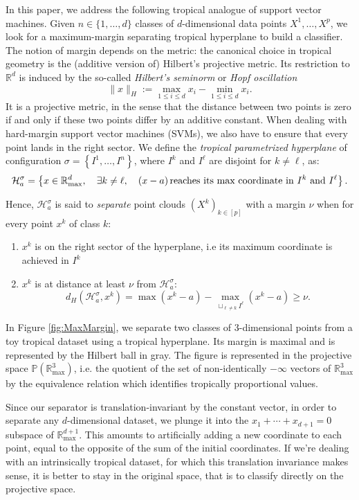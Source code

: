 \documentclass[oneside,english,a4paper]{amsart}
\numberwithin{equation}{section}
\numberwithin{figure}{section}
\theoremstyle{plain}
\theoremstyle{definition}
\theoremstyle{plain}
\theoremstyle{remark}
\theoremstyle{plain}
\theoremstyle{definition}
\theoremstyle{definition}
\begin{document}
In this paper, we address the following tropical analogue of support
vector machines. Given $n\in\{1,\ldots, d\}$ classes of $d$-dimensional data
points $X^{1},\ldots,X^{p}$, we look for a maximum-margin separating
tropical hyperplane to build a classifier. The notion of margin depends
on the metric: the canonical choice in tropical geometry is the (additive
version of) Hilbert's projective metric. Its restriction to $\mathbb{R}^{d}$
is induced by the so-called \emph{Hilbert's seminorm} or \emph{Hopf
oscillation}
\[
\lVert x\rVert_{H}:=\max_{1\le i\le d}x_{i}-\min_{1\le i\le d}x_{i}.
\]
It is a projective metric, in the sense that the distance between
two points is zero if and only if these two points differ by an additive
constant. When dealing with hard-margin support vector machines (SVMs),
we also have to ensure that every point lands in the right sector.
We define the \emph{tropical parametrized hyperplane} of configuration
$\sigma=\left\{I^{1},\ldots,I^{n}\right\}$, where $I^{k}$ and $I^{\ell}$
are disjoint for $k\ne\ell$, as:
\[
\mathcal{H}_{a}^{\sigma}=\left\{x\in\mathbb{R}_{\max}^{d},\quad\exists k\ne\ell,\quad (x-a)\,\text{reaches its max coordinate in \ensuremath{I^{k}} and \ensuremath{I^{\ell}}}\right\}.
\]

Hence, $\mathcal{H}_{a}^{\sigma}$ is said to \emph{separate} point
clouds $(X^{k})_{k\in[p]}$ with a margin $\nu$ when for every point
$x^{k}$ of class $k$:
\begin{enumerate}
\item $x^{k}$ is on the right sector of the hyperplane, i.e its maximum
coordinate is achieved in $I^{k}$
\item $x^{k}$ is at distance at least $\nu$ from $\mathcal{H}_{a}^{\sigma}$:
\begin{equation*}
d_H(\mathcal{H}_{a}^{\sigma},x^{k})=\max(x^{k}-a)-\max_{\sqcup_{\ell\ne k}I^{\ell}}(x^{k}-a)\ge\nu.
\end{equation*}
\end{enumerate}
In Figure \ref{fig:MaxMargin}, we separate two classes
of $3$-dimensional points from a toy tropical dataset using a tropical
hyperplane. Its margin is maximal and is represented by the Hilbert
ball in gray. The figure is represented in the projective space $\mathbb{P}\left(\mathbb{R}_{\text{max}}^{3}\right)$,
i.e. the quotient of the set of non-identically $-\infty$ vectors
of $\mathbb{R}_{\text{max}}^{3}$ by the equivalence relation which
identifies tropically proportional values.

Since our separator is translation-invariant by the constant vector, in order to separate any $d$-dimensional dataset, we plunge it into the $x_1+\cdots+x_{d+1}=0$ subspace of $\mathbb{R}_{\max}^{d+1}$. This amounts to artificially adding a new coordinate to each point, equal to the opposite of the sum of the initial coordinates. If we're dealing with an intrinsically tropical dataset, for which this translation invariance makes sense, it is better to stay in the original space, that is to classify directly on the projective space.
\end{document}
